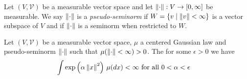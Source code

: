 \begin{defn}Let $(V, \mathcal{V})$ be a measurable vector space and let $\left \lVert \cdot \right \rVert : V \to [0,\infty]$ be measurable.  We say $\left \lVert \cdot \right \rVert$ is a \emph{pseudo-seminorm} if $W = \lbrace v \mid \left \lVert v \right \rVert < \infty \rbrace$ is a vector subspace of $V$ and if $\left \lVert \cdot \right \rVert$ is a seminorm when restricted to $W$.  
\end{defn}

\begin{lem}\label{lem:FerniqueLemma}Let $(V, \mathcal{V})$ be a measurable vector space, $\mu$ a centered Gaussian law and  pseudo-seminorm $\left \lVert \cdot \right \rVert$ such that $\mu(\left \lVert \cdot \right \rVert < \infty) >0$.  The for some 
$\epsilon > 0$ we have
\begin{align*}
\int \exp\left( \alpha \left \lVert x \right \rVert^2 \right) \, \mu(dx) &< \infty \text{ for all $0 < \alpha < \epsilon$}
\end{align*}
\end{lem}
